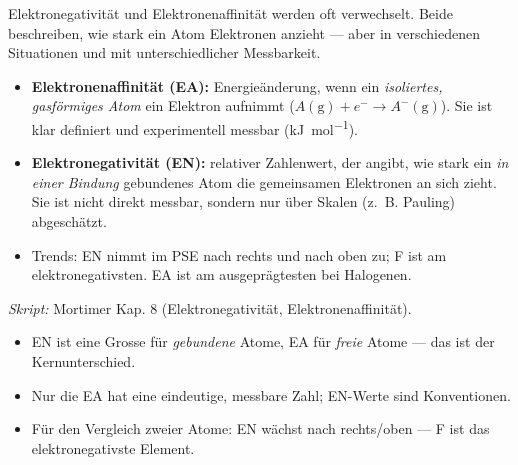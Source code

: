 
Elektronegativität und Elektronenaffinität werden oft verwechselt. Beide
beschreiben, wie stark ein Atom Elektronen anzieht --- aber in verschiedenen
Situationen und mit unterschiedlicher Messbarkeit.

\begin{werkzeugkasten}[EN vs. EA]
\begin{itemize}
  \item \textbf{Elektronenaffinität (EA):} Energieänderung, wenn ein
        \textit{isoliertes, gasförmiges Atom} ein Elektron aufnimmt
        ($A(\mathrm g)+e^- \to A^-(\mathrm g)$). Sie ist klar definiert und
        experimentell messbar (\si{\kilo\joule\per\mol}).
  \item \textbf{Elektronegativität (EN):} relativer Zahlenwert, der angibt, wie
        stark ein \textit{in einer Bindung} gebundenes Atom die gemeinsamen
        Elektronen an sich zieht. Sie ist nicht direkt messbar, sondern nur über
        Skalen (z.\ B. Pauling) abgeschätzt.
  \item Trends: EN nimmt im PSE nach rechts und nach oben zu; F ist am
        elektronegativsten. EA ist am ausgeprägtesten bei Halogenen.
\end{itemize}
\textit{Skript:} Mortimer Kap. 8 (Elektronegativität, Elektronenaffinität).
\end{werkzeugkasten}

\begin{achtung}
\begin{itemize}
  \item EN ist eine Grosse für \textit{gebundene} Atome, EA für \textit{freie}
        Atome --- das ist der Kernunterschied.
  \item Nur die EA hat eine eindeutige, messbare Zahl; EN-Werte sind
        Konventionen.
  \item Für den Vergleich zweier Atome: EN wächst nach rechts/oben --- F ist
        das elektronegativste Element.
\end{itemize}
\end{achtung}
